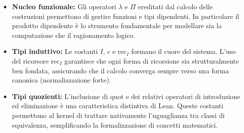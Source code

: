 \begin{itemize}
    \item \textbf{Nucleo funzionale:} 
        Gli operatori $\lambda$ e $\Pi$ ereditati dal calcolo delle costruzioni permettono di gestire funzioni e tipi dipendenti. In particolare
        il prodotto dipendente è lo strumento fondamentale per modellare sia la computazione che il ragionamento logico.
    \item \textbf{Tipi induttivo:} 
        Le costanti $I$, $c$ e $\text{rec}_I$ formano il cuore del sistema. L'uso del ricorsore $\text{rec}_I$ garantisce che ogni forma di ricorsione 
        sia strutturalmente ben fondata, assicurando che il calcolo converga sempre verso una forma canonica (normalizzazione forte).
    \item \textbf{Tipi quozienti:} 
        L'inclusione di $\text{quot}$ e dei relativi operatori di introduzione ed eliminazione è una caratteristica distintiva di Lean. Queste costanti 
        permettono al kernel di trattare nativamente l'uguaglianza tra classi di equivalenza, semplificando la formalizzazione di concetti matematici.
\end{itemize}

